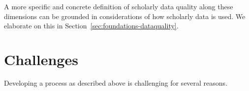 A more specific and concrete definition of scholarly data quality along these dimensions can be grounded in considerations of how scholarly data is used. We elaborate on this in Section~\ref{sec:foundations-dataquality}.

\section{Challenges}\label{sec:intro-challenges}




Developing a process as described above is challenging for several reasons.

